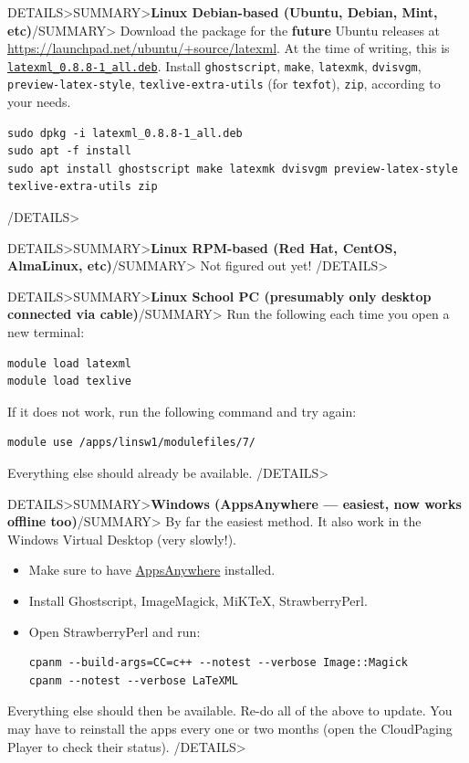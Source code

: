 \documentclass[a4paper,british]{article}
\newenvironment{foldedframe}[1][]{%
    \<DETAILS>\<SUMMARY>\textbf{#1}\</SUMMARY>}%
  {\</DETAILS>}
\newenvironment{foldedframe}[1][]{\bgroup\colorlet{TFFrameColor}{SpringGreen}
  \colorlet{TFTitleColor}{black}\begin{titled-frame}{#1}}{\end{titled-frame}\egroup}
\begin{document}
\begin{foldedframe}[Linux Debian-based (Ubuntu, Debian, Mint, etc)]
  Download the package for the \textbf{future} Ubuntu releases at \url{https://launchpad.net/ubuntu/+source/latexml}. At the time of writing, this is \texttt{\href{https://launchpad.net/ubuntu/+archive/primary/+files/latexml_0.8.8-1_all.deb}{latexml\_0.8.8-1\_all.deb}}. Install \texttt{ghostscript}, \texttt{make}, \texttt{latexmk}, \texttt{dvisvgm}, \texttt{preview-latex-style}, \texttt{texlive-extra-utils} (for \texttt{texfot}), \texttt{zip}, according to your needs.
  \begin{lstlisting}
sudo dpkg -i latexml_0.8.8-1_all.deb
sudo apt -f install
sudo apt install ghostscript make latexmk dvisvgm preview-latex-style texlive-extra-utils zip
  \end{lstlisting}
\end{foldedframe}

\begin{foldedframe}[Linux RPM-based (Red Hat, CentOS, AlmaLinux, etc)]
  Not figured out yet!
\end{foldedframe}

\begin{foldedframe}[Linux School PC (presumably only desktop connected via cable)]
  Run the following each time you open a new terminal:
  \begin{lstlisting}
module load latexml
module load texlive
    \end{lstlisting}
  If it does not work, run the following command and try again:
  \begin{lstlisting}
module use /apps/linsw1/modulefiles/7/
    \end{lstlisting}
  Everything else should already be available.
\end{foldedframe}

\begin{foldedframe}[Windows (AppsAnywhere --- easiest, now works offline too)]
  By far the easiest method. It also work in the Windows Virtual Desktop (very slowly!).
  \begin{itemize}
    \item Make sure to have \href{https://it.leeds.ac.uk/it?id=kb_article&sysparm_article=KB0014827}{AppsAnywhere} installed.
    \item Install Ghostscript, ImageMagick, MiK\TeX{}, StrawberryPerl.
    \item Open StrawberryPerl and run:
          \begin{lstlisting}
cpanm --build-args=CC=c++ --notest --verbose Image::Magick
cpanm --notest --verbose LaTeXML
        \end{lstlisting}
  \end{itemize}
  Everything else should then be available. Re-do all of the above to update. You may have to reinstall the apps every one or two months (open the CloudPaging Player to check their status).
\end{foldedframe}
\end{document}
